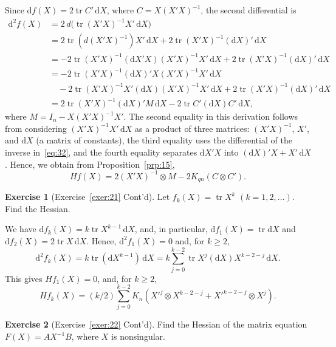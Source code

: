 \documentclass[12pt,a4paper]{article}
\makeatletter
\theoremstyle{definition}
\newtheorem{exercise}{Exercise}
\renewenvironment{proof}[1][\proofname]{\par
  \pushQED{\qed}%
  \normalfont \topsep6\p@\@plus6\p@\relax
  \trivlist
  \item[\hskip\labelsep\bfseries #1\@addpunct{.}]\ignorespaces
}{%
  \popQED\endtrivlist\@endpefalse
}
\newenvironment{solution}{%
  \begin{proof}[Solution]%
}{%
  \end{proof}%
}
\DeclareMathOperator{\tr}{tr}
\newcommand{\dd}{\mathrm{d}}
\makeatother
\begin{document}
\begin{solution}
Since $\dd f(X) = 2\tr C'\, \dd X$, where $C = X(X'X)^{-1}$, the second differential is
\begin{align*}
\dd^2 f(X) &= 2\, d\bigl(\tr(X'X)^{-1}X'\, \dd X\bigr) \\
&= 2\tr(d(X'X)^{-1})X'\, \dd X + 2\tr(X'X)^{-1}(\dd X)'\, \dd X \\
&= -2\tr(X'X)^{-1}(\dd X'X)(X'X)^{-1}X'\, \dd X + 2\tr(X'X)^{-1}(\dd X)'\, \dd X \\
&= -2\tr(X'X)^{-1}(\dd X)'X(X'X)^{-1}X'\, \dd X \\
&\quad - 2\tr(X'X)^{-1}X'(\dd X)(X'X)^{-1}X'\, \dd X + 2\tr(X'X)^{-1}(\dd X)'\, \dd X \\
&= 2\tr(X'X)^{-1}(\dd X)'M\, \dd X - 2\tr C'(\dd X)C'\, \dd X,
\end{align*}
where $M = I_n - X(X'X)^{-1}X'$. The second equality in this derivation follows from considering $(X'X)^{-1}X'\, \dd X$ as a product of three matrices: $(X'X)^{-1}$, $X'$, and $\dd X$ (a matrix of constants), the third equality uses the differential of the inverse in~\eqref{eq:32}, and the fourth equality separates $\dd X'X$ into $(\dd X)'X + X'\, \dd X$. Hence, we obtain from Proposition~\ref{prp:15},
\[
Hf(X) = 2(X'X)^{-1} \otimes M - 2K_{qn}(C \otimes C').
\]
\end{solution}

\begin{exercise}[Exercise~\ref{exer:21} Cont'd]\label{exer:31}
Let $f_k(X) = \tr X^k$ $(k = 1, 2, \dots)$. Find the Hessian.
\end{exercise}

\begin{solution}
We have $\dd f_k(X) = k\tr X^{k-1}\, \dd X$, and, in particular, $\dd f_1(X) = \tr \dd X$ and $\dd f_2(X) = 2\tr X\, \dd X$. Hence, $\dd^2 f_1(X) = 0$ and, for $k \geqslant 2$,
\[
\dd^2 f_k(X) = k\tr(\dd X^{k-1})\, \dd X = k\sum_{j=0}^{k-2} \tr X^j(\dd X) X^{k-2-j}\, \dd X.
\]
This gives $Hf_1(X) = 0$, and, for $k \geqslant 2$,
\[
Hf_k(X) = (k/2) \sum_{j=0}^{k-2} K_n(X'^j \otimes X^{k-2-j} + X'^{k-2-j} \otimes X^j).
\]
\end{solution}

\begin{exercise}[Exercise~\ref{exer:22} Cont'd]\label{exer:32}
Find the Hessian of the matrix equation $F(X) = AX^{-1}B$, where $X$ is nonsingular.
\end{exercise}
\end{document}

